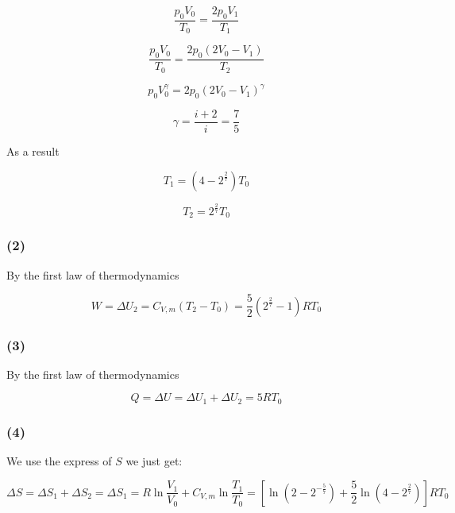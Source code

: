 \documentclass[a4paper,11pt]{amsart}
\theoremstyle{definition}
\begin{document}
	$$
	\frac{p_0V_0}{T_0}=\frac{2p_0V_1}{T_1}
	$$
	
	$$
	\frac{p_0V_0}{T_0}=\frac{2p_0\left( 2V_0-V_1 \right)}{T_2}
	$$
	
	$$
	p_0V_{0}^{\gamma}=2p_0\left( 2V_0-V_1 \right) ^{\gamma}
	$$
	
	$$
	\gamma =\frac{i+2}{i}=\frac{7}{5}
	$$
	
	As a result
	
	$$
	T_1=(4-2^\tfrac{2}{7})T_0
	$$
	
	$$
	T_2=2^\tfrac{2}{7}T_0
	$$
	
	\subsubsection*{(2)}
	
	By the first law of thermodynamics
	
	$$
	W=\Delta U_2=C_{V,m}(T_2-T_0)=\dfrac{5}{2}(2^\tfrac{2}{7}-1)RT_0
	$$
	
	\subsubsection*{(3)}
	
	By the first law of thermodynamics
	
	$$
	Q=\Delta U=\Delta U_1+\Delta U_2=5RT_0
	$$
	
	\subsubsection*{(4)}
	
	We use the express of $S$ we just get:
	
	$$
	\Delta S=\Delta S_1+\Delta S_2=\Delta S_1=R\ln \frac{V_1}{V_0}+C_{V,m}\ln \frac{T_1}{T_0}=\left[ \ln \left( 2-2^{-\tfrac{5}{7}} \right) +\frac{5}{2}\ln \left( 4-2^{\tfrac{2}{7}} \right) \right] RT_0
	$$
	
\end{document}
